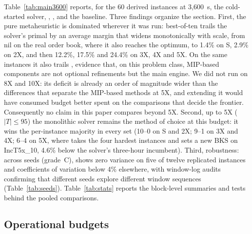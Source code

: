 Table~\ref{tab:main3600} reports, for the 60 derived instances at
3{,}600~s, the cold-started solver, \RFFO{}, \RFMIP{}, and the
\ILS{} baseline. Three findings organize the section. First, the
pure metaheuristic is dominated wherever it was run: \ILS{}
best-of-ten trails the solver's primal by an average margin that
widens monotonically with scale, from nil on the real order book,
where it also reaches the optimum, to 1.4\% on S, 2.9\% on 2X, and
then 12.2\%, 17.5\% and 24.4\% on 3X, 4X and 5X. On the same
instances it also trails \RFFO{}, evidence that, on this problem
class, MIP-based components are not optional refinements but the
main engine. We did not run \ILS{} on 8X and 10X: its deficit is
already an order of magnitude wider than the differences that
separate the MIP-based methods at 5X, and extending it would have
consumed budget better spent on the comparisons that decide the
frontier. Consequently no claim in this paper compares \ILS{} beyond
5X.
Second, up to 5X ($|T|\le 95$) the monolithic solver remains the
method of choice at this budget: it wins the per-instance majority
in every set (10--0 on S and 2X; 9--1 on 3X and 4X; 6--4 on 5X,
where \RFFO{} takes the four hardest instances and sets a new BKS on
IncT5x\_10, 4.6\% below the solver's three-hour incumbent). Third,
robustness: across seeds (grade~C), \RFFO{} shows zero variance on
five of twelve replicated instances and coefficients of variation
below 4\% elsewhere, with window-log audits confirming that
different seeds explore different window sequences
(Table~\ref{tab:seeds}).
Table~\ref{tab:stats} reports the block-level summaries and tests
behind the pooled comparisons.




\clearpage

\subsection{Operational budgets}
\label{sec:short}

